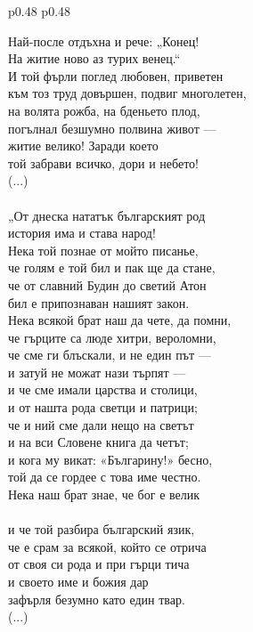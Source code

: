 \documentclass[12pt,a4paper]{article}
\begin{document}
\begin{tabular}{p{0.48\textwidth} p{0.48\textwidth}}
\begin{minipage}[t]{\linewidth}
Най-после отдъхна и рече: „Конец!\\
На житие ново аз турих венец.“\\
И той фърли поглед любовен, приветен\\
към тоз труд довършен, подвиг многолетен,\\
на волята рожба, на бденьето плод,\\
погълнал безшумно полвина живот —\\
житие велико! Заради което\\
той забрави всичко, дори и небето!\\
(...)\\
\\
„От днеска нататък българският род\\
история има и става народ!\\
Нека той познае от мойто писанье,\\
че голям е той бил и пак ще да стане,\\
че от славний Будин до светий Атон\\
бил е припознаван нашият закон.\\
Нека всякой брат наш да чете, да помни,\\
че гърците са люде хитри, вероломни,\\
че сме ги блъскали, и не един път —\\
и затуй не можат нази търпят —\\
и че сме имали царства и столици,\\
и от нашта рода светци и патрици;\\
че и ний сме дали нещо на светът\\
и на вси Словене книга да четът;\\
и кога му викат: «Българину!» бесно,\\
той да се гордее с това име честно.\\
Нека наш брат знае, че бог е велик\\\\
и че той разбира българский язик,\\
че е срам за всякой, който се отрича\\
от своя си рода и при гърци тича\\
и своето име и божия дар\\
зафърля безумно като един твар.\\
(...)\\

\end{minipage}
\end{tabular}
\end{document}
